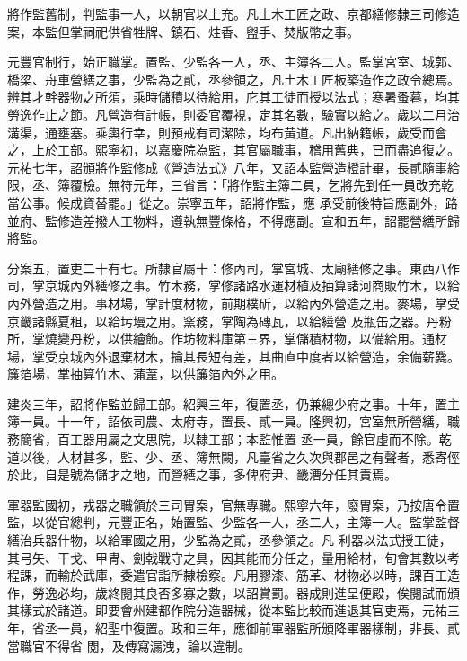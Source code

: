 \begin{pinyinscope}
 將作監舊制，判監事一人，以朝官以上充。凡土木工匠之政、京都繕修隸三司修造案，本監但掌祠祀供省牲牌、鎮石、炷香、盥手、焚版幣之事。



 元豐官制行，始正職掌。置監、少監各一人，丞、主簿各二人。監掌宮室、城郭、橋梁、舟車營繕之事，少監為之貳，丞參領之，凡土木工匠板築造作之政令總焉。辨其才幹器物之所須，乘時儲積以待給用，庀其工徒而授以法式；寒暑蚤暮，均其
 勞逸作止之節。凡營造有計帳，則委官覆視，定其名數，驗實以給之。歲以二月治溝渠，通壅塞。乘輿行幸，則預戒有司潔除，均布黃道。凡出納籍帳，歲受而會之，上於工部。熙寧初，以嘉慶院為監，其官屬職事，稽用舊典，已而盡追復之。元祐七年，詔頒將作監修成《營造法式》八年，又詔本監營造橙計畢，長貳隨事給限，丞、簿覆檢。無符元年，三省言：「將作監主簿二員，乞將先到任一員改充乾當公事。候成資替罷。」從之。崇寧五年，詔將作監，應
 承受前後特旨應副外，路並府、監修造差撥人工物料，遵執無豐條格，不得應副。宣和五年，詔罷營繕所歸將監。



 分案五，置吏二十有七。所隸官屬十：修內司，掌宮城、太廟繕修之事。東西八作司，掌京城內外繕修之事。竹木務，掌修諸路水運材植及抽算諸河商販竹木，以給內外營造之用。事材場，掌計度材物，前期樸斫，以給內外營造之用。麥場，掌受京畿諸縣夏租，以給圬墁之用。窯務，掌陶為磚瓦，以給繕營
 及瓶缶之器。丹粉所，掌燒變丹粉，以供繪飾。作坊物料庫第三界，掌儲積材物，以備給用。通材場，掌受京城內外退棄材木，掄其長短有差，其曲直中度者以給營造，余備薪爨。簾箔場，掌抽算竹木、蒲葦，以供簾箔內外之用。



 建炎三年，詔將作監並歸工部。紹興三年，復置丞，仍兼總少府之事。十年，置主簿一員。十一年，詔依司農、太府寺，置長、貳一員。隆興初，宮室無所營繕，職務簡省，百工器用屬之文思院，以隸工部；本監惟置
 丞一員，餘官虛而不除。乾道以後，人材甚多，監、少、丞、簿無闕，凡臺省之久次與郡邑之有聲者，悉寄俓於此，自是號為儲才之地，而營繕之事，多俾府尹、畿漕分任其責焉。



 軍器監國初，戎器之職領於三司胃案，官無專職。熙寧六年，廢胃案，乃按唐令置監，以從官總判，元豐正名，始置監、少監各一人，丞二人，主簿一人。監掌監督繕治兵器什物，以給軍國之用，少監為之貳，丞參領之。凡
 利器以法式授工徒，其弓矢、干戈、甲冑、劍戟戰守之具，因其能而分任之，量用給材，旬會其數以考程課，而輸於武庫，委遣官詣所隸檢察。凡用膠漆、筋革、材物必以時，課百工造作，勞逸必均，歲終閱其良否多寡之數，以詔賞罰。器成則進呈便殿，俟閱試而頒其樣式於諸道。即要會州建都作院分造器械，從本監比較而進退其官吏焉，元祐三年，省丞一員，紹聖中復置。政和三年，應御前軍器監所頒降軍器樣制，非長、貳當職官不得省
 閱，及傳寫漏洩，論以違制。




\end{pinyinscope}

